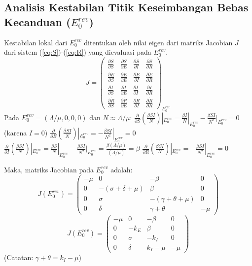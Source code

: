 \documentclass[12pt,a4paper]{article}
\begin{document}
\subsection{Analisis Kestabilan Titik Keseimbangan Bebas Kecanduan ($E_0^{rev}$)}
Kestabilan lokal dari $E_0^{rev}$ ditentukan oleh nilai eigen dari matriks Jacobian $J$ dari sistem (\ref{eq:S})-(\ref{eq:R}) yang dievaluasi pada $E_0^{rev}$.
$$ J = \begin{pmatrix}
\frac{\partial \dot{S}}{\partial S} & \frac{\partial \dot{S}}{\partial E} & \frac{\partial \dot{S}}{\partial I} & \frac{\partial \dot{S}}{\partial R} \\
\frac{\partial \dot{E}}{\partial S} & \frac{\partial \dot{E}}{\partial E} & \frac{\partial \dot{E}}{\partial I} & \frac{\partial \dot{E}}{\partial R} \\
\frac{\partial \dot{I}}{\partial S} & \frac{\partial \dot{I}}{\partial E} & \frac{\partial \dot{I}}{\partial I} & \frac{\partial \dot{I}}{\partial R} \\
\frac{\partial \dot{R}}{\partial S} & \frac{\partial \dot{R}}{\partial E} & \frac{\partial \dot{R}}{\partial I} & \frac{\partial \dot{R}}{\partial R}
\end{pmatrix}_{E_0^{rev}} $$
Pada $E_0^{rev} = (\Lambda/\mu, 0, 0, 0)$ dan $N \approx \Lambda/\mu$:
$\frac{\partial}{\partial S}(\frac{\beta SI}{N})|_{E_0^{rev}} = \frac{\beta I}{N}|_{E_0^{rev}} - \frac{\beta SI}{N^2}|_{E_0^{rev}} = 0$ (karena $I=0$)
$\frac{\partial}{\partial E}(\frac{\beta SI}{N})|_{E_0^{rev}} = -\frac{\beta SI}{N^2}|_{E_0^{rev}} = 0$
$\frac{\partial}{\partial I}(\frac{\beta SI}{N})|_{E_0^{rev}} = \frac{\beta S}{N}|_{E_0^{rev}} - \frac{\beta SI}{N^2}|_{E_0^{rev}} = \frac{\beta (\Lambda/\mu)}{(\Lambda/\mu)} = \beta$
$\frac{\partial}{\partial R}(\frac{\beta SI}{N})|_{E_0^{rev}} = -\frac{\beta SI}{N^2}|_{E_0^{rev}} = 0$

Maka, matriks Jacobian pada $E_0^{rev}$ adalah:
$$ J(E_0^{rev}) = \begin{pmatrix}
-\mu & 0 & -\beta & 0 \\
0 & -(\sigma+\delta+\mu) & \beta & 0 \\
0 & \sigma & -(\gamma+\theta+\mu) & 0 \\
0 & \delta & \gamma+\theta & -\mu
\end{pmatrix} $$
$$ J(E_0^{rev}) = \begin{pmatrix}
-\mu & 0 & -\beta & 0 \\
0 & -k_E & \beta & 0 \\
0 & \sigma & -k_I & 0 \\
0 & \delta & k_I - \mu & -\mu
\end{pmatrix} $$
(Catatan: $\gamma+\theta = k_I - \mu$)
\end{document}
